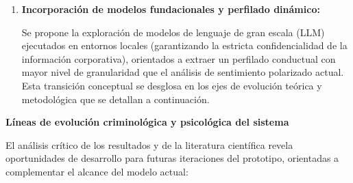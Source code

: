 \documentclass[IB]{TFUOC}%
\begin{document}
\begin{enumerate}
    \item \textbf{Incorporación de modelos fundacionales y perfilado dinámico:}
    
    Se propone la exploración de modelos de lenguaje de gran escala (LLM) ejecutados en entornos locales (garantizando la estricta confidencialidad de la información corporativa), orientados a extraer un perfilado conductual con mayor nivel de granularidad que el análisis de sentimiento polarizado actual. Esta transición conceptual se desglosa en los ejes de evolución teórica y metodológica que se detallan a continuación.
\end{enumerate}

\medskip
\noindent\textbf{Líneas de evolución criminológica y psicológica del sistema}

\medskip
\noindent El análisis crítico de los resultados y de la literatura científica revela oportunidades de desarrollo para futuras iteraciones del prototipo, orientadas a complementar el alcance del modelo actual:
\end{document}
